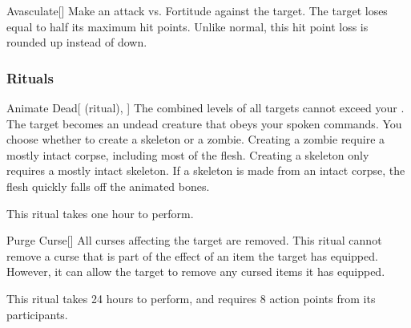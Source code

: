 \lowercase{\hypertarget{spell:Avasculate}{}}\label{spell:Avasculate}
\begin{freeability}[Rank 8]{\hypertarget{spell:Avasculate}{Avasculate}}[]
Make an attack vs. Fortitude against the target.
\hit The target loses  equal to half its maximum hit points.
Unlike normal, this hit point loss is rounded up instead of down.
\end{freeability}
\vspace{0.25em}



\subsubsection{Rituals}


\lowercase{\hypertarget{spell:Animate Dead}{}}\label{spell:Animate Dead}
\begin{attuneability}[Rank 3]{\hypertarget{spell:Animate Dead}{Animate Dead}}[ (ritual), ]
The combined levels of all targets cannot exceed your .
The target becomes an undead creature that obeys your spoken commands.
You choose whether to create a skeleton or a zombie.
Creating a zombie require a mostly intact corpse, including most of the flesh.
Creating a skeleton only requires a mostly intact skeleton.
If a skeleton is made from an intact corpse, the flesh quickly falls off the animated bones.

This ritual takes one hour to perform.
\end{attuneability}
\vspace{0.25em}



\lowercase{\hypertarget{spell:Purge Curse}{}}\label{spell:Purge Curse}
\begin{apability}[Rank 3]{\hypertarget{spell:Purge Curse}{Purge Curse}}[]
All curses affecting the target are removed.
This ritual cannot remove a curse that is part of the effect of an item the target has equipped.
However, it can allow the target to remove any cursed items it has equipped.

This ritual takes 24 hours to perform, and requires 8 action points from its participants.
\end{apability}
\vspace{0.25em}



